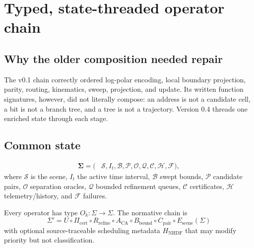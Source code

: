 \documentclass[11pt,a4paper,openany]{book}
\newcommand{\SigmaState}{\boldsymbol{\Sigma}}
\begin{document}
\chapter{Typed, state-threaded operator chain}
\section{Why the older composition needed repair}
The v0.1 chain correctly ordered log-polar encoding, local boundary projection, parity, routing, kinematics, sweep, projection, and update. Its written function signatures, however, did not literally compose: an address is not a candidate cell, a bit is not a branch tree, and a tree is not a trajectory. Version 0.4 threads one enriched state through each stage.

\section{Common state}
\begin{align}
\SigmaState = (&\mathcal{S}, I_t, \mathcal{B}, \mathcal{P}, \mathcal{O}, \mathcal{Q},
\mathcal{C}, \mathcal{H}, \mathcal{F}),
\end{align}
where $\mathcal{S}$ is the scene, $I_t$ the active time interval, $\mathcal{B}$ swept bounds, $\mathcal{P}$ candidate pairs, $\mathcal{O}$ separation oracles, $\mathcal{Q}$ bounded refinement queues, $\mathcal{C}$ certificates, $\mathcal{H}$ telemetry/history, and $\mathcal{F}$ failures.

Every operator has type $O_k:\Sigma\rightarrow\Sigma$. The normative chain is
\begin{equation}
\boxed{
\Sigma' = U\circ\Pi_{\mathrm{cert}}\circ R_{\mathrm{refine}}\circ A_{\mathrm{CA}}
\circ B_{\mathrm{bound}}\circ C_{\mathrm{pair}}\circ E_{\mathrm{scene}}(\Sigma)
}
\end{equation}
with optional source-traceable scheduling metadata $H_{\mathrm{NHDF}}$ that may modify priority but not classification.
\end{document}
